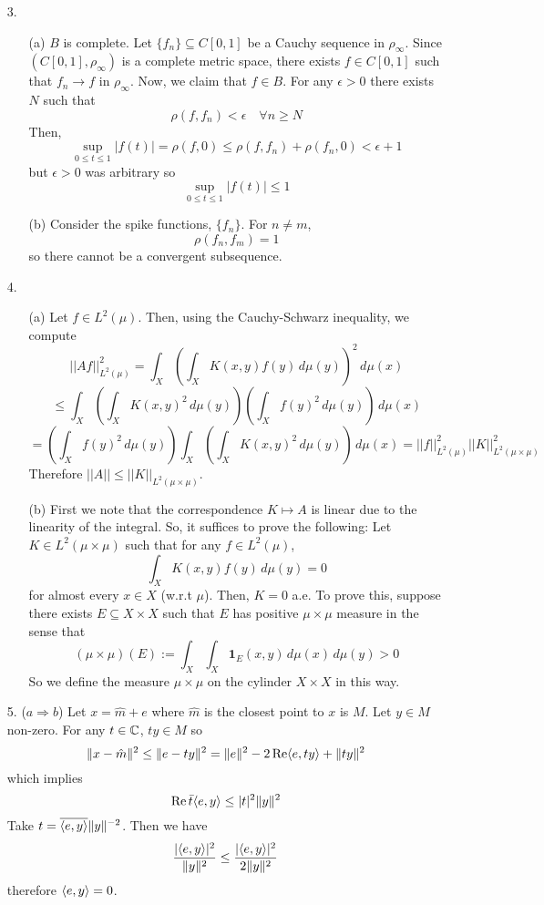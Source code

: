 \begin{itemize}

\item[3.] \begin{itemize}
	\item[(a)] $B$ is complete. Let $\{f_n\} \subseteq C[0,1]$ be a Cauchy sequence in $\rho_\infty$. Since $(C[0,1],\rho_\infty)$ is a complete metric space, there exists $f \in C[0,1]$ such that $f_n \to f$ in $\rho_\infty$. Now, we claim that $f \in B$. For any $\epsilon >0$ there exists $N$ such that
	\[ \rho(f,f_n) < \epsilon \quad \forall n \ge N \]
Then,
	\[ \sup_{0\le t \le 1} |f(t)| = \rho(f,0) \le \rho(f,f_n) + \rho(f_n,0) < \epsilon + 1 \]
but $\epsilon >0$ was arbitrary so 
	\[ \sup_{0\le t \le 1} |f(t)| \le 1 \]
	\item[(b)] Consider the spike functions, $\{f_n\}$. For $n \ne m$,
	\[ \rho(f_n,f_m) = 1 \]
	so there cannot be a convergent subsequence.
\end{itemize}

\item[4.]\begin{itemize}
	\item[(a)] Let $f \in L^2(\mu)$. Then, using the Cauchy-Schwarz inequality, we compute
		\[ ||Af||_{L^2(\mu)}^2 = \int_X \left( \int_X K(x,y) f(y) \, d \mu(y) \right)^2\, d \mu(x) \] 
		\[ \le \int_X \left( \int_X K(x,y)^2 \, d \mu(y) \right) \left( \int_X f(y)^2 \, d\mu(y) \right) \, d \mu(x) \]
		\[ = \left( \int_X f(y)^2 \, d\mu(y) \right) \int_X \left( \int_X K(x,y)^2 \, d \mu(y) \right) \, d \mu(x)= ||f||^2_{L^2(\mu)} ||K||_{L^2(\mu \times \mu)}^2\]
Therefore $||A|| \le ||K||_{L^2(\mu \times \mu)}$.
	\item[(b)] First we note that the correspondence $K \mapsto A$ is linear due to the linearity of the integral. So, it suffices to prove the following: Let $K \in L^2(\mu \times \mu)$ such that for any $f \in L^2(\mu)$,
	\[ \int_X K(x,y) f(y) \, d \mu(y) = 0 \]
for almost every $x \in X$ (w.r.t $\mu$). Then, $K=0$ a.e. To prove this, suppose there exists $E \subseteq X \times X$ such that $E$ has positive $\mu \times \mu$ measure in the sense that
	\[ (\mu \times \mu) (E) :=\int_X \int _X \mathbf{1}_E(x,y) \, d\mu(x) \, d \mu(y) > 0\]
So we define the measure $\mu \times \mu$ on the cylinder $X \times X$ in this way.
\end{itemize}

\item[5.] \label{q:s13-5}
($a \Rightarrow b$) Let $x = \hat m + e$ where $\hat m$ is the closest point to $x$ is $M$. Let $y \in M$ non-zero. For any $t \in \mathbb{C}$, $ty \in M$ so
	\[ \|x-\hat m\|^2 \le \|e-ty\|^2 = \|e\|^2 - 2\operatorname{Re} \langle e,ty \rangle + \|ty\|^2 \]
which implies
	\[ \operatorname{Re} \bar t \langle e,y\rangle \le |t|^2 \|y\|^2 \]
Take $t = \overline{\langle e,y\rangle} \|y\|^{-2}$. Then we have
	\[ \dfrac{|\langle e,y\rangle|^2}{\|y\|^2} \le \dfrac{|\langle e,y\rangle|^2}{2\|y\|^2} \]
therefore $\langle e,y\rangle =0$.



\end{itemize}
